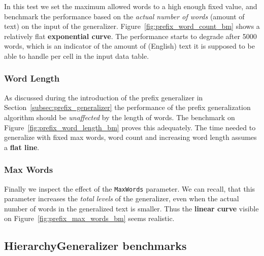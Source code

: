In this test we set the maximum allowed words to a high enough fixed value, and benchmark the performance based on the \emph{actual number of words} (amount of text) on the input of the generalizer. Figure~\ref{fig:prefix_word_count_bm} shows a relatively flat \textbf{exponential curve}. The performance starts to degrade after 5000 words, which is an indicator of the amount of (English) text it is supposed to be able to handle per cell in the input data table.

\vspace{\baselineskip}


\subsubsection{Word Length}

As discussed during the introduction of the prefix generalizer in Section~\ref{subsec:prefix_generalizer} the performance of the prefix generalization algorithm should be \emph{unaffected} by the length of words. The benchmark on Figure~\ref{fig:prefix_word_length_bm} proves this adequately. The time needed to generalize with fixed max words, word count and increasing word length assumes a \textbf{flat line}.

\vspace{\baselineskip}


\subsubsection{Max Words}

Finally we inspect the effect of the \texttt{MaxWords} parameter. We can recall, that this parameter increases the \emph{total levels} of the generalizer, even when the actual number of words in the generalized text is smaller. Thus the \textbf{linear curve} visible on Figure~\ref{fig:prefix_max_words_bm} seems realistic.

\vspace{\baselineskip}


\subsection{HierarchyGeneralizer benchmarks}


